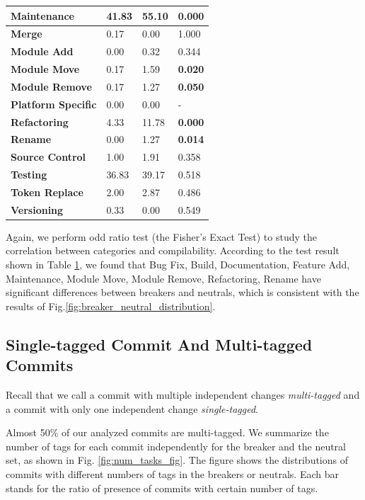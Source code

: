 \begin{table}[htbp]
\begin{tabular}{llll}
      \hline
      \textbf{Maintenance} & 41.83  & 55.10  & \textbf{0.000} \\
      \hline
      \textbf{Merge} & 0.17  & 0.00  & 1.000  \\
      \hline
      \textbf{Module Add} & 0.00  & 0.32  & 0.344  \\
      \hline
      \textbf{Module Move} & 0.17  & 1.59  & \textbf{0.020} \\
      \hline
      \textbf{Module Remove} & 0.17  & 1.27  & \textbf{0.050} \\
      \hline
      \textbf{Platform Specific} & 0.00  & 0.00  & - \\
      \hline
      \textbf{Refactoring} & 4.33  & 11.78  & \textbf{0.000} \\
      \hline
      \textbf{Rename} & 0.00  & 1.27  & \textbf{0.014} \\
      \hline
      \textbf{Source Control} & 1.00  & 1.91  & 0.358  \\
      \hline
      \textbf{Testing} & 36.83  & 39.17  & 0.518  \\
      \hline
      \textbf{Token Replace} & 2.00  & 2.87  & 0.486  \\
      \hline
      \textbf{Versioning} & 0.33  & 0.00  & 0.549  \\
      \hline
      \end{tabular}%
    \label{tab:breaker_neutral}%
  \end{table}%

Again, we perform odd ratio test (the Fisher's Exact Test) to study the correlation between categories and compilability. 
According to the test result shown in Table \ref{tab:breaker_neutral}, we found that Bug Fix, Build, Documentation, Feature Add, Maintenance, Module Move, Module Remove, Refactoring, Rename have significant differences between breaker{}s and neutral{}s, which is consistent with the results of Fig.\ref{fig:breaker_neutral_distribution}.



\subsection{Single-tagged Commit And Multi-tagged Commits}

Recall that we call a commit with multiple independent changes \textit{multi-tagged} and a commit with only one independent change \textit{single-tagged}.

Almost 50\% of our analyzed commits are multi-tagged.
We summarize the number of tags for each commit independently for the breaker and the neutral set, as shown in Fig. \ref{fig:num_tasks_fig}. 
The figure shows the distributions of commits with different numbers of tags in the breaker{}s or neutral{}s. 
Each bar stands for the ratio of presence of commits with certain number of tags.

